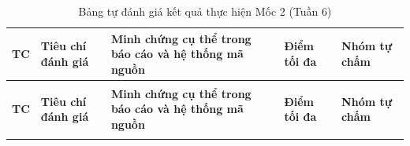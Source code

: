 \documentclass[12pt,a4paper,oneside,openany]{report}
\renewcommand{\arraystretch}{1.25}
\begin{document}
\vspace{0.4cm}

\begingroup
\small
\renewcommand{\arraystretch}{1.15}
\setlength{\extrarowheight}{1pt}
\begin{xltabular}{\textwidth}{|>{\centering\arraybackslash}p{0.8cm}|p{3.2cm}|X|>{\centering\arraybackslash}p{1.2cm}|>{\centering\arraybackslash}p{1.2cm}|}
  \caption{Bảng tự đánh giá kết quả thực hiện Mốc 2 (Tuần 6)} \label{tab:tudanhgia_kt2} \\
  \hline
  \textbf{TC} & \textbf{Tiêu chí đánh giá} & \textbf{Minh chứng cụ thể trong báo cáo và hệ thống mã nguồn} & \textbf{Điểm tối đa} & \textbf{Nhóm tự chấm} \\ \hline
  \endfirsthead

   \\[4pt] \hline
  \textbf{TC} & \textbf{Tiêu chí đánh giá} & \textbf{Minh chứng cụ thể trong báo cáo và hệ thống mã nguồn} & \textbf{Điểm tối đa} & \textbf{Nhóm tự chấm} \\ \hline
  \endhead

  \hline
  \endfoot

  \hline
  \endlastfoot


\end{xltabular}
\end{document}

